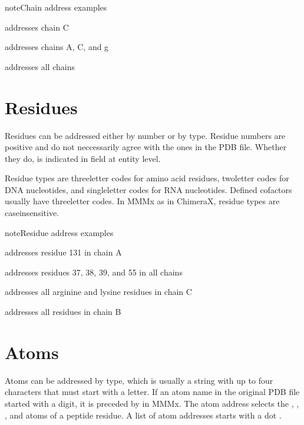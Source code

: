 \documentclass[letterpaper,10pt,english]{sphinxmanual}
\begin{document}
\begin{sphinxadmonition}{note}{Chain address examples}

  addresses chain C

 addresses chains A, C, and g

\sphinxcode{\sphinxupquote{(*)}} addresses all chains
\end{sphinxadmonition}


\section{Residues}
\label{\detokenize{MMMx_addresses:residues}}
Residues can be addressed either by number or by type. Residue numbers are positive and do not neccessarily agree with the ones in the PDB file. Whether they do, is indicated in field  at entity level.

Residue types are three\sphinxhyphen{}letter codes for amino acid residues, two\sphinxhyphen{}letter codes for DNA nucleotides, and single\sphinxhyphen{}letter codes for RNA nucleotides. Defined cofactors usually have three\sphinxhyphen{}letter codes. In MMMx as in ChimeraX, residue types are case\sphinxhyphen{}insensitive.

\begin{sphinxadmonition}{note}{Residue address examples}

  addresses residue 131 in chain A

 addresses residues 37, 38, 39, and 55 in all chains

 addresses all arginine and lysine residues in chain C

 addresses all residues in chain B
\end{sphinxadmonition}


\section{Atoms}
\label{\detokenize{MMMx_addresses:atoms}}
Atoms can be addressed by type, which is usually a string with up to four characters that must start with a letter.
If an atom name in the original PDB file started with a digit, it is preceded by  in MMMx.
The atom address  selects the , , , and  atoms of a peptide residue.
A list of atom addresses starts with a dot .
\end{document}
